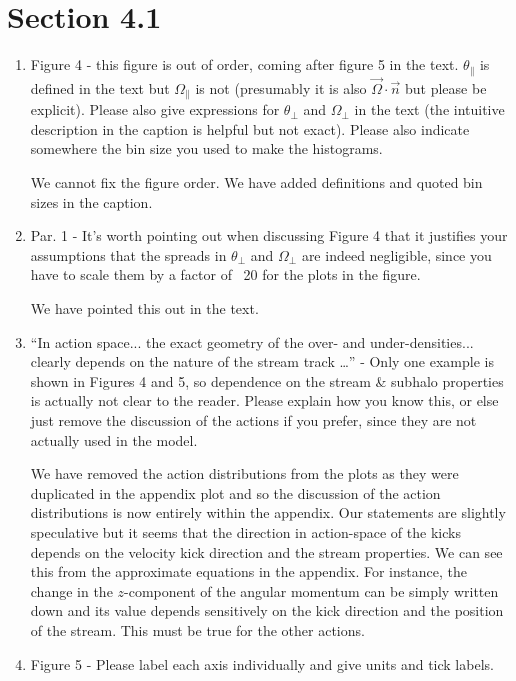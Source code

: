 \documentclass{article}
\begin{document}
\section{Section 4.1}
\begin{enumerate}
\item Figure 4 - this figure is out of order, coming after figure 5 in the text. $\theta_\parallel$ is
defined in the text but $\Omega_\parallel$ is not (presumably it is also $\vec{\Omega} \cdot
\vec{n}$ but please be explicit). Please also give expressions for $\theta_\perp$ and
$\Omega_\perp$ in the text (the intuitive description in the caption is helpful but not exact).
Please also indicate somewhere the bin size you used to make the histograms.

{\color{red} We cannot fix the figure order. We have added definitions and quoted bin sizes in the caption.}

\item Par. 1 - It’s worth pointing out when discussing Figure 4 that it justifies your
assumptions that the spreads in $\theta_\perp$ and $\Omega_\perp$ are indeed negligible,
since you have to scale them by a factor of ~20 for the plots in the figure.

{\color{red} We have pointed this out in the text.}

\item “In action space... the exact geometry of the over- and under-densities... clearly depends
on the nature of the stream track \dots” - Only one example is shown in Figures 4 and 5, so
dependence on the stream \& subhalo properties is actually not clear to the reader.
Please explain how you know this, or else just remove the discussion of the actions if
you prefer, since they are not actually used in the model.

{\color{red} We have removed the action distributions from the plots as they were duplicated in the appendix plot and so the discussion of the action distributions is now entirely within the appendix. Our statements are slightly speculative but it seems that the direction in action-space of the kicks depends on the velocity kick direction and the stream properties. We can see this from the approximate equations in the appendix. For instance, the change in the $z$-component of the angular momentum can be simply written down and its value depends sensitively on the kick direction and the position of the stream. This must be true for the other actions.}


\item Figure 5 - Please label each axis individually and give units and tick labels.


\end{enumerate}
\end{document}
